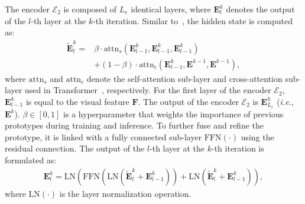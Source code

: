 \documentclass[10pt,twocolumn,letterpaper]{article}
\begin{document}
    The encoder $\mathcal{E}_2$ is composed of $L_{e}$ identical layers, where $\bm{E}_l^{k}$ denotes the output of the $l$-th layer at the $k$-th iteration. 
    Similar to~\cite{zhu2020incorporating}, the hidden state is computed as:
    \begin{equation}
    \begin{aligned}
    \label{equ:4}
    \widetilde{\bm{E}}_l^{k}=&\beta \cdot \text{attn}_s(\bm{E}_{l-1}^{k},\bm{E}_{l-1}^{k},\bm{E}_{l-1}^{k})\\
    &+(1-\beta)\cdot \text{attn}_c(\bm{E}_{l-1}^{k},\bm{E}^{k-1},\bm{E}^{k-1}),
    \end{aligned}
    \end{equation}
    where $\text{attn}_s$ and $\text{attn}_c$ denote the self-attention sub-layer and cross-attention sub-layer used in Transformer~\cite{vaswani2017attention}, respectively.
    For the first layer of the encoder $\mathcal{E}_2$, $\bm{E}_{l-1}^{k}$ is equal to the visual feature $\bm{F}$.
    The output of the encoder $\mathcal{E}_2$ is $\bm{E}_{L_e}^{k}$ (\emph{i.e.}, $\bm{E}^{k}$).
    $\beta \in \left[0,1\right]$ is a hyperparameter that weights the importance of previous prototypes during training and inference. To further fuse and refine the prototype, it is linked with a fully connected sub-layer $\text{FFN}(\cdot)$ using the residual connection. The output of the $l$-th layer at the $k$-th iteration is formulated as:
    \begin{equation}
    \begin{aligned}
    \label{equ:5}
    \bm{E}_l^{k}=\text{LN}(\text{FFN}(\text{LN}(\widetilde{\bm{E}}_l^{k}+\bm{E}_{l-1}^{k}))+\text{LN}(\widetilde{\bm{E}}_l^{k}+\bm{E}_{l-1}^{k})),
    \end{aligned}
    \end{equation}
    where $\text{LN}(\cdot)$ is the layer normalization operation.
\end{document}
